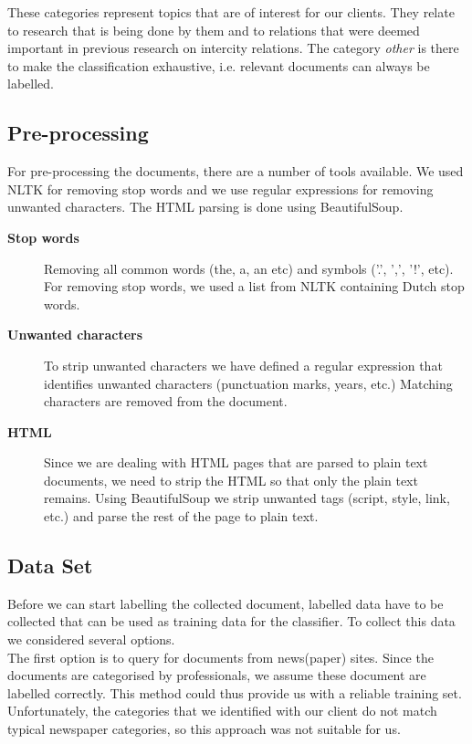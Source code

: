 These categories represent topics that are of interest for our clients. They relate to research that is being done by them and to relations that were deemed important in previous research on intercity relations. The category \textit{other} is there to make the classification exhaustive, i.e. relevant documents can always be labelled.

\subsection{Pre-processing}
For pre-processing the documents, there are a number of tools available. We used NLTK \cite{nlkt_stemming} for removing stop words and we use regular expressions for removing unwanted characters. The HTML parsing is done using BeautifulSoup\cite{BeautifulSoup}.

\begin{description}
\item[\textbf{Stop words}]
Removing all common words (the, a, an etc) and symbols ('.', ',', '!', etc). For removing stop words, we used a list from NLTK containing Dutch stop words.
\item[\textbf{Unwanted characters}]
To strip unwanted characters we have defined a regular expression that identifies unwanted characters (punctuation marks, years, etc.) Matching characters are removed from the document. 
\item[\textbf{HTML}]
Since we are dealing with HTML pages that are parsed to plain text documents, we need to strip the HTML so that only the plain text remains. Using BeautifulSoup we strip unwanted tags (script, style, link, etc.) and parse the rest of the page to plain text.
\end{description}

\subsection{Data Set}\label{sec: data-set-research}
Before we can start labelling the collected document, labelled data have to be collected that can be used as training data for the classifier. To collect this data we considered several options.\\

The first option is to query for documents from news(paper) sites. Since the documents are categorised by professionals, we assume these document are labelled correctly. This method could thus provide us with a reliable training set.
Unfortunately, the categories that we identified with our client do not match typical newspaper categories, so this approach was not suitable for us.\\

